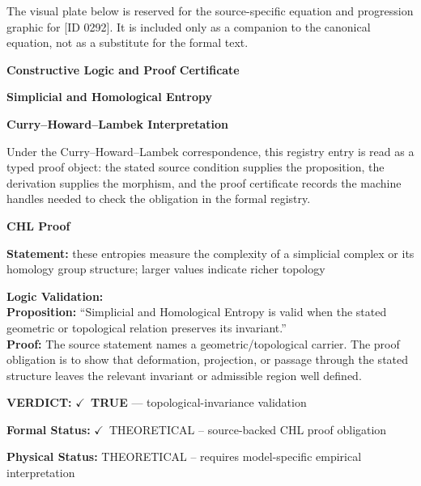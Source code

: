 \begingroup\footnotesize\sloppy
The visual plate below is reserved for the source-specific equation and progression graphic for [ID 0292]. It is included only as a companion to the canonical equation, not as a substitute for the formal text.
\par\endgroup
\ifTZPDarkEdition
{}
\fi

\clearpage
\begingroup\tzpsupportsetup
\noindent\textbf{\fontsize{10.8pt}{12.8pt}\selectfont [ID 0292] Constructive Logic and Proof Certificate}\par
\noindent\textbf{\fontsize{10pt}{12pt}\selectfont Simplicial and Homological Entropy}\par
\vspace{0.45em}
\begingroup
\footnotesize
\setlength{\parskip}{0.22em}
\setlength{\parindent}{0pt}
\noindent\textbf{Curry--Howard--Lambek Interpretation}\par
Under the Curry--Howard--Lambek correspondence, this registry entry is read as a typed proof
object: the stated source condition supplies the proposition, the derivation supplies the
morphism, and the proof certificate records the machine handles needed to check the obligation
in the formal registry.

\vspace{0.45em}
\noindent\textbf{CHL Proof}\par
\textbf{Statement:} these entropies measure the complexity of a simplicial complex or its homology group
structure; larger values indicate richer topology

\textbf{Logic Validation:}\\
\textbf{Proposition:} ``Simplicial and Homological Entropy is valid when the stated geometric or topological
relation preserves its invariant.''\\
\textbf{Proof:} The source statement names a geometric/topological carrier. The proof obligation is to
show that deformation, projection, or passage through the stated structure leaves the
relevant invariant or admissible region well defined.

\textbf{VERDICT:} \ensuremath{\checkmark}\ \textbf{TRUE} --- topological-invariance validation

\textbf{Formal Status:} \ensuremath{\checkmark}\ THEORETICAL -- source-backed CHL proof obligation

\textbf{Physical Status:} THEORETICAL -- requires model-specific empirical interpretation
\par\vspace{0.45em}
\par
\ifTZPDarkEdition
{}
\fi
\endgroup
\endgroup
